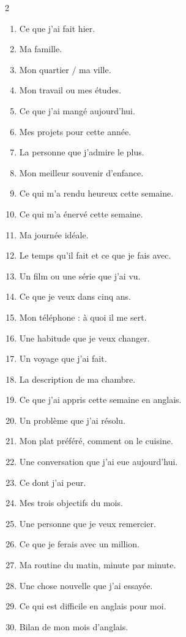 \begin{tableau}
\footnotesize
\begin{multicols}{2}
\begin{enumerate}
\item Ce que j'ai fait hier.
\item Ma famille.
\item Mon quartier / ma ville.
\item Mon travail ou mes études.
\item Ce que j'ai mangé aujourd'hui.
\item Mes projets pour cette année.
\item La personne que j'admire le plus.
\item Mon meilleur souvenir d'enfance.
\item Ce qui m'a rendu heureux cette semaine.
\item Ce qui m'a énervé cette semaine.
\item Ma journée idéale.
\item Le temps qu'il fait et ce que je fais avec.
\item Un film ou une série que j'ai vu.
\item Ce que je veux dans cinq ans.
\item Mon téléphone : à quoi il me sert.
\item Une habitude que je veux changer.
\item Un voyage que j'ai fait.
\item La description de ma chambre.
\item Ce que j'ai appris cette semaine en anglais.
\item Un problème que j'ai résolu.
\item Mon plat préféré, comment on le cuisine.
\item Une conversation que j'ai eue aujourd'hui.
\item Ce dont j'ai peur.
\item Mes trois objectifs du mois.
\item Une personne que je veux remercier.
\item Ce que je ferais avec un million.
\item Ma routine du matin, minute par minute.
\item Une chose nouvelle que j'ai essayée.
\item Ce qui est difficile en anglais pour moi.
\item Bilan de mon mois d'anglais.
\end{enumerate}
\end{multicols}
\end{tableau}

